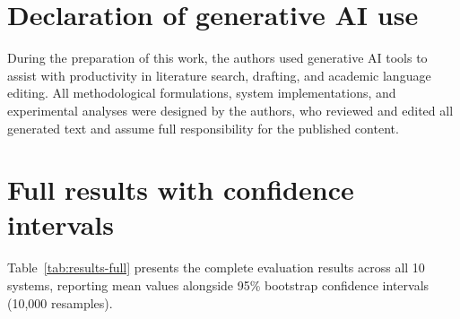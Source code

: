 \documentclass[preprint,10pt]{elsarticle}
\begin{document}
\section*{Declaration of generative AI use}
During the preparation of this work, the authors used generative AI tools to assist with productivity in literature search, drafting, and academic language editing. All methodological formulations, system implementations, and experimental analyses were designed by the authors, who reviewed and edited all generated text and assume full responsibility for the published content.

\appendix
\section{Full results with confidence intervals}
\label{app:full-results}
Table~\ref{tab:results-full} presents the complete evaluation results across all 10 systems, reporting mean values alongside 95\% bootstrap confidence intervals (10,000 resamples).

\begin{table}[!htbp]
\centering
\caption{Complete evaluation results across all 10 systems on \nVerified{} verified benchmark questions, reporting mean [95\% bootstrap confidence intervals].}
\label{tab:results-full}
\scriptsize
\setlength{\tabcolsep}{2pt}
\resizebox{\textwidth}{!}{%
}
\end{table}
\end{document}
